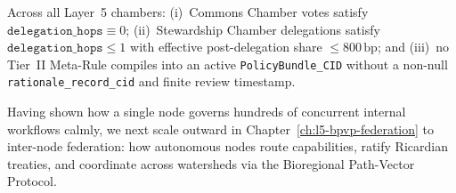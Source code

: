 \begin{invariant}
\label{inv:ch4-meta-rule}
Across all Layer~5 chambers: (i)~Commons Chamber votes satisfy $\mathtt{delegation\_hops} \equiv
0$; (ii)~Stewardship Chamber delegations satisfy $\mathtt{delegation\_hops} \le 1$ with effective
post-delegation share $\le 800\,\mathrm{bp}$; and (iii)~no Tier~II Meta-Rule compiles into an
active \texttt{PolicyBundle\_CID} without a non-null \texttt{rationale\_record\_cid} and finite
review timestamp.
\end{invariant}

Having shown how a single node governs hundreds of concurrent internal workflows calmly, we next
scale outward in Chapter~\ref{ch:l5-bpvp-federation} to inter-node federation: how autonomous
nodes route capabilities, ratify Ricardian treaties, and coordinate across watersheds via the
Bioregional Path-Vector Protocol.
